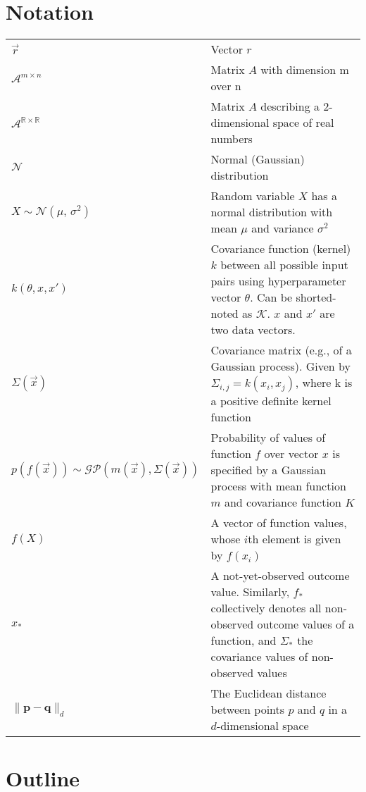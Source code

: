 \section*{Notation}
\begin{tabularx}{\linewidth}{l@{\quad}X}
	$\vec{r}$ & Vector $r$ \\
	$\mathcal{A}^{m \times n}$ & Matrix $A$ with dimension m over n \\
	$\mathcal{A}^{\mathbb{R} \times \mathbb{R}}$ & Matrix $A$ describing a 2-dimensional space of real numbers \\
	$\mathcal{N}$ 	&	Normal (Gaussian) distribution \\
	$X \sim \mathcal{N}(\mu,\,\sigma^{2})$	&	Random variable $X$ has a normal distribution with mean $\mu$ and variance $\sigma^{2}$ \\
	$k\left( \theta, x, x' \right)$ & Covariance function (kernel) $k$ between all possible input pairs using hyperparameter vector $\theta$. Can be shorted-noted as $\mathcal{K}$. $x$ and $x'$ are two data vectors. \\
	$\Sigma(\vec{x})$	&	Covariance matrix (e.g., of a Gaussian process). Given by $\Sigma_{i,j} = k(x_i, x_j)$, where k is a positive definite kernel function \\
	$p\left( f \left( \vec{x} \right) \right) \sim \mathcal{GP}\left( m(\vec{x}), \Sigma(\vec{x}) \right)$	&	Probability of values of function $f$ over vector $x$ is specified by a Gaussian process with mean function $m$ and covariance function $K$ \\
	$f(X)$	&	A vector of function values, whose $i$th element is given by $f(x_i)$ \\
	$x_*$	&	A not-yet-observed outcome value. Similarly, $f_*$ collectively denotes all non-observed outcome values of a function, and $\Sigma_*$ the covariance values of non-observed values \\
	$\lVert \mathbf{p - q} \rVert_d$ & The Euclidean distance between points $p$ and $q$ in a $d$-dimensional space
\end{tabularx}
  	
\newpage
\section*{Outline}
